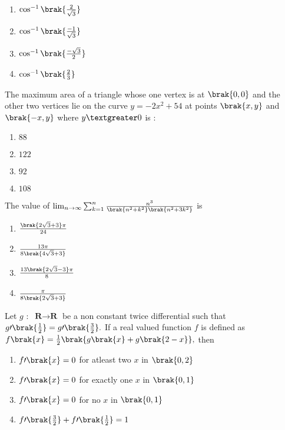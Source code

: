 	  \hfill{}  \\
    \begin{enumerate}
        \item $\cos^{-1}\brak{\frac{2}{\sqrt{3}}}$
        \item $\cos^{-1}\brak{\frac{-1}{\sqrt{3}}}$
        \item $\cos^{-1}\brak{\frac{-\sqrt{3}}{2}}$
        \item $\cos^{-1}\brak{\frac{2}{3}}$
    \end{enumerate}
    \item The maximum area of a triangle whose one vertex is at $\brak{0,0}$ and the other two vertices lie on the curve $y=-2x^2+54$ at points $\brak{x,y}$ and $\brak{-x,y}$ where $y\textgreater 0$ is $:$
	  \hfill{}  \\
    \begin{enumerate}
        \item $88$
        \item $122$
        \item $92$
        \item $108$
    \end{enumerate}
    \item The value of $\lim_{n \to \infty}\sum_{k=1}^n\frac{n^3}{\brak{n^2+k^2}\brak{n^2+3k^2}}$ is 
	   \hfill{} \\
    \begin{enumerate}
        \item $\frac{\brak{2\sqrt{3}+3}\pi}{24}$
        \item $\frac{13\pi}{8\brak{4\sqrt{3}+3}}$
        \item $\frac{13\brak{2\sqrt{3}-3}\pi}{8}$
        \item $\frac{\pi}{8\brak{2\sqrt{3}+3}}$
    \end{enumerate}
    \item Let $g$ $:$ $\textbf{R}\to\textbf{R}$ be a non constant twice differential such that $g\prime\brak{\frac{1}{2}}=g\prime\brak{\frac{3}{2}}.$ If a real valued function $f$ is defined as $f\brak{x}=\frac{1}{2}\brak{g\brak{x}+g\brak{2-x}},$ then
	  \hfill{}  \\
    \begin{enumerate}
        \item $f\prime\brak{x}=0$ for atleast two $x$ in $\brak{0,2}$
        \item $f\prime\brak{x}=0$ for exactly one $x$ in $\brak{0,1}$
        \item $f\prime\brak{x}=0$ for no $x$ in $\brak{0,1}$
        \item $f\prime\brak{\frac{3}{2}}+f\prime\brak{\frac{1}{2}}=1$
    \end{enumerate}
